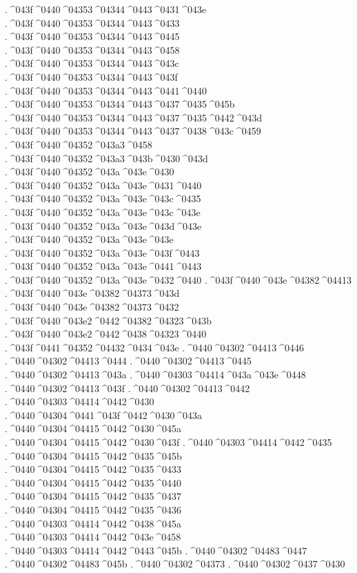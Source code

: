 {.^^^^043f^^^^0440^^^^04353^^^^04344^^^^0443^^^^0431^^^^043e
.^^^^043f^^^^0440^^^^04353^^^^04344^^^^0443^^^^0433
.^^^^043f^^^^0440^^^^04353^^^^04344^^^^0443^^^^0445
.^^^^043f^^^^0440^^^^04353^^^^04344^^^^0443^^^^0458
.^^^^043f^^^^0440^^^^04353^^^^04344^^^^0443^^^^043c
.^^^^043f^^^^0440^^^^04353^^^^04344^^^^0443^^^^043f
.^^^^043f^^^^0440^^^^04353^^^^04344^^^^0443^^^^0441^^^^0440
.^^^^043f^^^^0440^^^^04353^^^^04344^^^^0443^^^^0437^^^^0435^^^^045b
.^^^^043f^^^^0440^^^^04353^^^^04344^^^^0443^^^^0437^^^^0435^^^^0442^^^^043d
.^^^^043f^^^^0440^^^^04353^^^^04344^^^^0443^^^^0437^^^^0438^^^^043c^^^^0459
.^^^^043f^^^^0440^^^^04352^^^^043a3^^^^0458
.^^^^043f^^^^0440^^^^04352^^^^043a3^^^^043b^^^^0430^^^^043d
.^^^^043f^^^^0440^^^^04352^^^^043a^^^^043e^^^^0430
.^^^^043f^^^^0440^^^^04352^^^^043a^^^^043e^^^^0431^^^^0440
.^^^^043f^^^^0440^^^^04352^^^^043a^^^^043e^^^^043c^^^^0435
.^^^^043f^^^^0440^^^^04352^^^^043a^^^^043e^^^^043c^^^^043e
.^^^^043f^^^^0440^^^^04352^^^^043a^^^^043e^^^^043d^^^^043e
.^^^^043f^^^^0440^^^^04352^^^^043a^^^^043e^^^^043e
.^^^^043f^^^^0440^^^^04352^^^^043a^^^^043e^^^^043f^^^^0443
.^^^^043f^^^^0440^^^^04352^^^^043a^^^^043e^^^^0441^^^^0443
.^^^^043f^^^^0440^^^^04352^^^^043a^^^^043e^^^^0432^^^^0440
.^^^^043f^^^^0440^^^^043e^^^^04382^^^^04413
.^^^^043f^^^^0440^^^^043e^^^^04382^^^^04373^^^^043d
.^^^^043f^^^^0440^^^^043e^^^^04382^^^^04373^^^^0432
.^^^^043f^^^^0440^^^^043e2^^^^0442^^^^04382^^^^04323^^^^043b
.^^^^043f^^^^0440^^^^043e2^^^^0442^^^^0438^^^^04323^^^^0440
.^^^^043f^^^^0441^^^^04352^^^^04432^^^^0434^^^^043e
.^^^^0440^^^^04302^^^^04413^^^^0446
.^^^^0440^^^^04302^^^^04413^^^^0444
.^^^^0440^^^^04302^^^^04413^^^^0445
.^^^^0440^^^^04302^^^^04413^^^^043a
.^^^^0440^^^^04303^^^^04414^^^^043a^^^^043e^^^^0448
.^^^^0440^^^^04302^^^^04413^^^^043f
.^^^^0440^^^^04302^^^^04413^^^^0442
.^^^^0440^^^^04303^^^^04414^^^^0442^^^^0430
.^^^^0440^^^^04304^^^^0441^^^^043f^^^^0442^^^^0430^^^^043a
.^^^^0440^^^^04304^^^^04415^^^^0442^^^^0430^^^^045a
.^^^^0440^^^^04304^^^^04415^^^^0442^^^^0430^^^^043f
.^^^^0440^^^^04303^^^^04414^^^^0442^^^^0435
.^^^^0440^^^^04304^^^^04415^^^^0442^^^^0435^^^^045b
.^^^^0440^^^^04304^^^^04415^^^^0442^^^^0435^^^^0433
.^^^^0440^^^^04304^^^^04415^^^^0442^^^^0435^^^^0440
.^^^^0440^^^^04304^^^^04415^^^^0442^^^^0435^^^^0437
.^^^^0440^^^^04304^^^^04415^^^^0442^^^^0435^^^^0436
.^^^^0440^^^^04303^^^^04414^^^^0442^^^^0438^^^^045a
.^^^^0440^^^^04303^^^^04414^^^^0442^^^^043e^^^^0458
.^^^^0440^^^^04303^^^^04414^^^^0442^^^^0443^^^^045b
.^^^^0440^^^^04302^^^^04483^^^^0447
.^^^^0440^^^^04302^^^^04483^^^^045b
.^^^^0440^^^^04302^^^^04373
.^^^^0440^^^^04302^^^^0437^^^^0430
}
